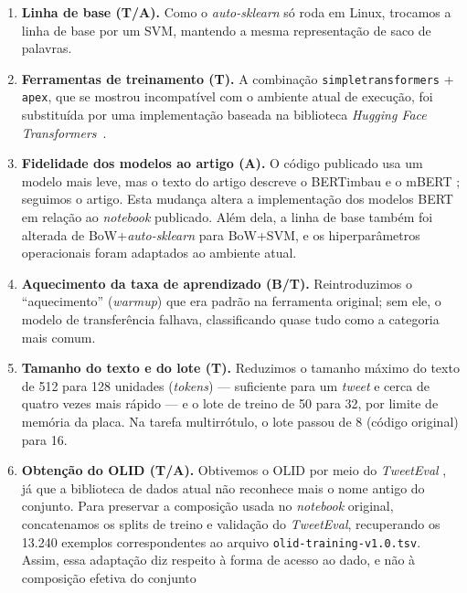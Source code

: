 \documentclass[sigconf, nonacm]{acmart}
\begin{document}
\begin{enumerate}
  \item \textbf{Linha de base \textnormal{(T/A)}.} Como o
        \emph{auto-sklearn} só roda em Linux, trocamos a linha de base por
        um SVM, mantendo a mesma representação de saco de palavras.
  \item \textbf{Ferramentas de treinamento \textnormal{(T)}.} A combinação
        \texttt{simple\allowbreak{}transformers} + \texttt{apex}, que se
        mostrou incompatível com o ambiente atual de execução, foi
        substituída por uma implementação baseada na biblioteca
        \emph{Hugging Face Transformers}~\cite{wolf2020transformers}.
  \item \textbf{Fidelidade dos modelos ao artigo \textnormal{(A)}.} O
        código publicado usa um modelo mais leve, mas o texto do artigo
        descreve o BERTimbau \cite{souza2020bertimbau} e o mBERT
        \cite{devlin2019bert}; seguimos o artigo. Esta mudança altera a
        implementação dos modelos BERT em relação ao \emph{notebook}
        publicado. Além dela, a linha de base também foi alterada de
        BoW+\emph{auto-sklearn} para BoW+SVM, e os hiperparâmetros
        operacionais foram adaptados ao ambiente atual.
  \item \textbf{Aquecimento da taxa de aprendizado \textnormal{(B/T)}.}
        Reintroduzimos o ``aquecimento'' (\emph{warmup}) que era padrão na
        ferramenta original; sem ele, o modelo de transferência falhava,
        classificando quase tudo como a categoria mais comum.
  \item \textbf{Tamanho do texto e do lote \textnormal{(T)}.} Reduzimos o
        tamanho máximo do texto de 512 para 128 unidades (\emph{tokens})
        --- suficiente para um \emph{tweet} e cerca de quatro vezes mais
        rápido --- e o lote de treino de 50 para 32, por limite de memória
        da placa. Na tarefa multirrótulo, o lote passou de 8 (código
        original) para 16.
  \item \textbf{Obtenção do OLID \textnormal{(T/A)}.}
        Obtivemos o OLID por meio do \emph{TweetEval}
        \cite{barbieri2020tweeteval}, já que a biblioteca de dados atual
        não reconhece mais o nome antigo do conjunto. Para preservar a
        composição usada no \emph{notebook} original, concatenamos os
        splits de treino e validação do \emph{TweetEval}, recuperando os
        13.240 exemplos correspondentes ao arquivo
        \texttt{olid-training-v1.0.tsv}. Assim, essa adaptação diz respeito
        à forma de acesso ao dado, e não à composição efetiva do conjunto

\end{enumerate}
\end{document}

